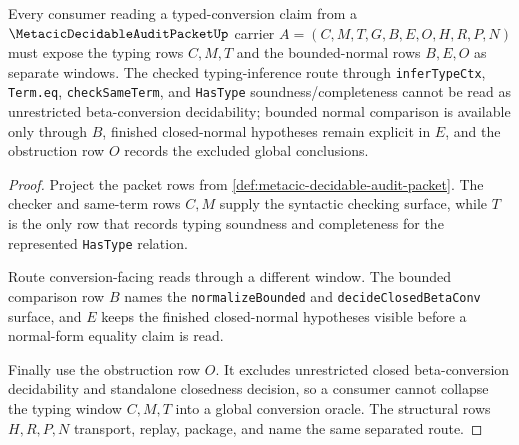 \begin{theorem}
\label{thm:typed-conversion-window-obligation-surface}
Every consumer reading a typed-conversion claim from a $\MetacicDecidableAuditPacketUp$ carrier $A=(C,M,T,G,B,E,O,H,R,P,N)$ must expose the typing rows $C,M,T$ and the bounded-normal rows $B,E,O$ as separate windows. The checked typing-inference route through \texttt{inferTypeCtx}, \texttt{Term.eq}, \texttt{checkSameTerm}, and \texttt{HasType} soundness/completeness cannot be read as unrestricted beta-conversion decidability; bounded normal comparison is available only through $B$, finished closed-normal hypotheses remain explicit in $E$, and the obstruction row $O$ records the excluded global conclusions.
\end{theorem}
\begin{proof}
Project the packet rows from \autoref{def:metacic-decidable-audit-packet}. The checker and same-term rows $C,M$ supply the syntactic checking surface, while $T$ is the only row that records typing soundness and completeness for the represented \texttt{HasType} relation.

Route conversion-facing reads through a different window. The bounded comparison row $B$ names the \texttt{normalizeBounded} and \texttt{decideClosedBetaConv} surface, and $E$ keeps the finished closed-normal hypotheses visible before a normal-form equality claim is read.

Finally use the obstruction row $O$. It excludes unrestricted closed beta-conversion decidability and standalone closedness decision, so a consumer cannot collapse the typing window $C,M,T$ into a global conversion oracle. The structural rows $H,R,P,N$ transport, replay, package, and name the same separated route.
\end{proof}

